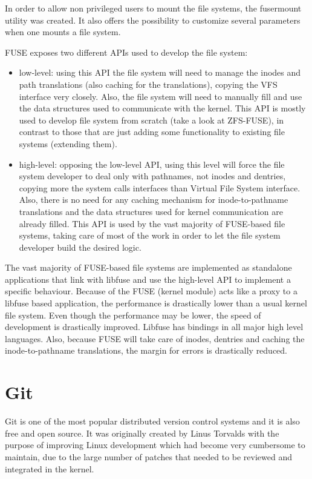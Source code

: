         In order to allow non privileged users to mount the file systems, the fusermount utility was created. It also offers the possibility to customize several parameters when one mounts a file system.

        FUSE exposes two different APIs used to develop the file system:
        \begin{itemize}
            \item low-level: using this API the file system will need to manage the inodes and path translations (also caching for the translations), copying the VFS interface very closely. Also, the file system will need to manually fill and use the data structures used to communicate with the kernel. This API is mostly used to develop file system from scratch (take a look at ZFS-FUSE), in contrast to those that are just adding some functionality to existing file systems (extending them).
            \item high-level: opposing the low-level API, using this level will force the file system developer to deal only with pathnames, not inodes and dentries, copying more the system calls interfaces than Virtual File System interface. Also, there is no need for any caching mechanism for inode-to-pathname translations and the data structures used for kernel communication are already filled. This API is used by the vast majority of FUSE-based file systems, taking care of most of the work in order to let the file system developer build the desired logic.
        \end{itemize}

        The vast majority of FUSE-based file systems are implemented as standalone applications that link with libfuse and use the high-level API to implement a specific behaviour. Because of the FUSE (kernel module) acts like a proxy to a libfuse based application, the performance is drastically lower than a usual kernel file system. Even though the performance may be lower, the speed of development is drastically improved. Libfuse has bindings in all major high level languages. Also, because FUSE will take care of inodes, dentries and caching the inode-to-pathname translations, the margin for errors is drastically reduced.

\section{Git}
    Git is one of the most popular distributed version control systems and it is also free and open source. It was originally created by Linus Torvalds with the purpose of improving Linux development which had become very cumbersome to maintain, due to the large number of patches that needed to be reviewed and integrated in the kernel.

